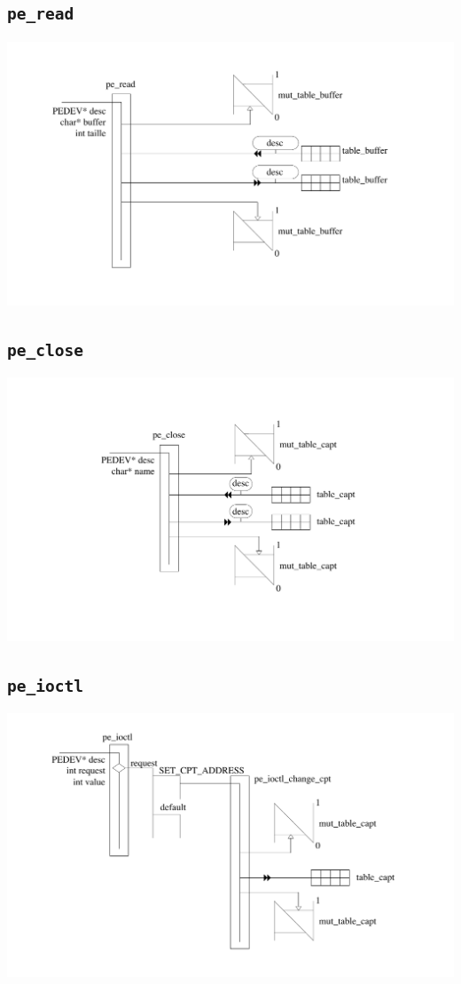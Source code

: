 \documentclass[11pt, a4paper]{article}
\newcommand{\kw}[1]{\texttt{#1}}
\begin{document}
\subsection{\kw{pe\_read}}
\includegraphics[width=\textwidth]{ressources/pe_read.pdf}
\subsection{\kw{pe\_close}}
\includegraphics[width=\textwidth]{ressources/pe_close.pdf}
\subsection{\kw{pe\_ioctl}}
\includegraphics[width=\textwidth]{ressources/pe_ioctl.pdf}
\end{document}
